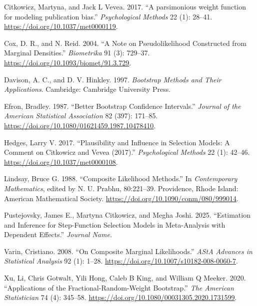 \documentclass[
]{article}
\newlength{\cslhangindent}
\newenvironment{CSLReferences}[2] %
 {\begin{list}{}{%
  \setlength{\itemindent}{0pt}
  \setlength{\leftmargin}{0pt}
  \setlength{\parsep}{0pt}
  \ifodd #1
   \setlength{\leftmargin}{\cslhangindent}
   \setlength{\itemindent}{-1\cslhangindent}
  \fi
  \setlength{\itemsep}{#2\baselineskip}}}
 {\end{list}}
\begin{document}
\protect{}\label{refs}
\begin{CSLReferences}{1}{0}
Citkowicz, Martyna, and Jack L Vevea. 2017. {``{A parsimonious weight
function for modeling publication bias}.''} \emph{Psychological Methods}
22 (1): 28--41. \url{https://doi.org/10.1037/met0000119}.

Cox, D. R., and N. Reid. 2004. {``A Note on Pseudolikelihood Constructed
from Marginal Densities.''} \emph{Biometrika} 91 (3): 729--37.
\url{https://doi.org/10.1093/biomet/91.3.729}.

Davison, A. C., and D. V. Hinkley. 1997. \emph{Bootstrap Methods and
Their Applications}. Cambridge: Cambridge University Press.

Efron, Bradley. 1987. {``Better Bootstrap Confidence Intervals.''}
\emph{Journal of the American Statistical Association} 82 (397):
171--85. \url{https://doi.org/10.1080/01621459.1987.10478410}.

Hedges, Larry V. 2017. {``Plausibility and Influence in Selection
Models: {A} Comment on {Citkowicz} and {Vevea} (2017).''}
\emph{Psychological Methods} 22 (1): 42--46.
\url{https://doi.org/10.1037/met0000108}.

Lindsay, Bruce G. 1988. {``Composite Likelihood Methods.''} In
\emph{Contemporary {Mathematics}}, edited by N. U. Prabhu, 80:221--39.
Providence, Rhode Island: American Mathematical Society.
\url{https://doi.org/10.1090/conm/080/999014}.

Pustejovsky, James E., Martyna Citkowicz, and Megha Joshi. 2025.
{``Estimation and Inference for Step-Function Selection Models in
Meta-Analysis with Dependent Effects.''} \emph{Journal Name}.

Varin, Cristiano. 2008. {``On Composite Marginal Likelihoods.''}
\emph{AStA Advances in Statistical Analysis} 92 (1): 1--28.
\url{https://doi.org/10.1007/s10182-008-0060-7}.

Xu, Li, Chris Gotwalt, Yili Hong, Caleb B King, and William Q Meeker.
2020. {``Applications of the Fractional-Random-Weight Bootstrap.''}
\emph{The American Statistician} 74 (4): 345--58.
\url{https://doi.org/10.1080/00031305.2020.1731599}.

\end{CSLReferences}
\end{document}
